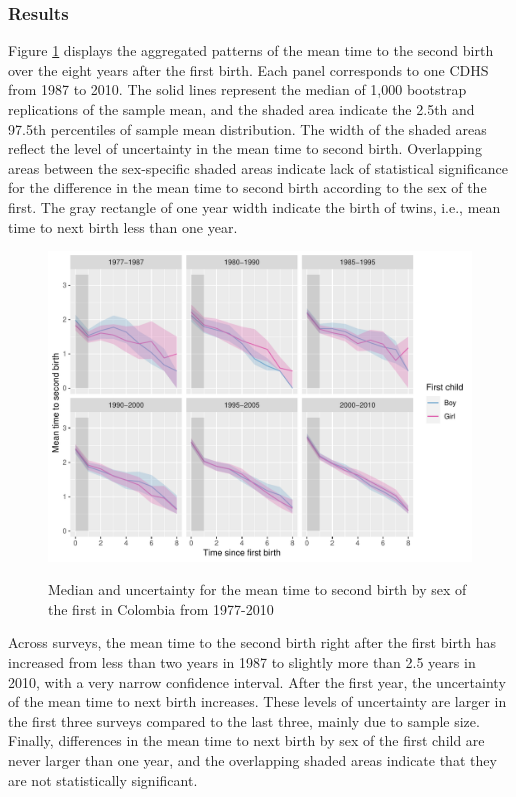 \documentclass[a4paper,left=1.25cm,right=1.25cm,top=1.25cm,bottom=1.25cm]{article}
\begin{document}
\subsubsection{Results}
Figure \ref{fert_01} displays the aggregated patterns of the mean time to the second birth over the eight years after the first birth. Each panel corresponds to one CDHS from 1987 to 2010. The solid lines represent the median of 1,000 bootstrap replications of the sample mean, and the shaded area indicate the 2.5th and 97.5th percentiles of sample mean distribution. The width of the shaded areas reflect the level of uncertainty in the mean time to second birth. Overlapping areas between the sex-specific shaded areas indicate lack of statistical significance for the difference in the mean time to second birth according to the sex of the first. The gray rectangle of one year width indicate the birth of twins, i.e., mean time to next birth less than one year.
\begin{figure}[H]
\centering
    \includegraphics[width=\textwidth]{Spells/Figures/colombia/colombia_period_new_1.pdf}\\
    \caption{Median and uncertainty for the mean time to second birth by sex of the first in Colombia from 1977-2010}
    \label{fert_01}
 \end{figure}

Across surveys, the mean time to the second birth right after the first birth has increased from less than two years in 1987 to slightly more than 2.5 years in 2010, with a very narrow confidence interval. After the first year, the uncertainty of the mean time to next birth increases. These levels of uncertainty are larger in the first three surveys compared to the last three, mainly due to sample size. Finally, differences in the mean time to next birth by sex of the first child are never larger than one year, and the overlapping shaded areas indicate that they are not statistically significant.
\end{document}
